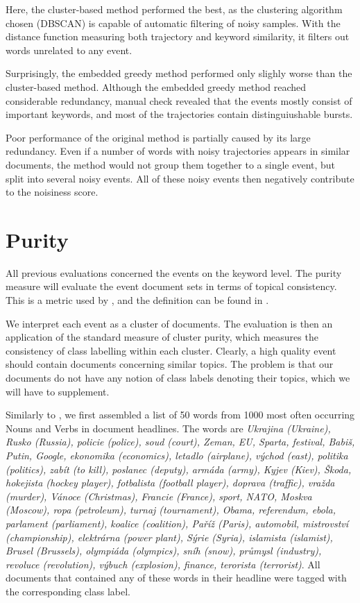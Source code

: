 Here, the cluster-based method performed the best, as the clustering algorithm chosen (DBSCAN) is capable of automatic filtering of noisy samples. With the distance function measuring both trajectory and keyword similarity, it filters out words unrelated to any event.

Surprisingly, the embedded greedy method performed only slighly worse than the cluster-based method. Although the embedded greedy method reached considerable redundancy, manual check revealed that the events mostly consist of important keywords, and most of the trajectories contain distinguiushable bursts.

Poor performance of the original method is partially caused by its large redundancy. Even if a number of words with noisy trajectories appears in similar documents, the method would not group them together to a single event, but split into several noisy events. All of these noisy events then negatively contribute to the noisiness score.

\section{Purity} \label{sec:purity}

All previous evaluations concerned the events on the keyword level. The purity measure will evaluate the event document sets in terms of topical consistency. This is a metric used by \cite{document-purity}, and the definition can be found in \cite{information-retrieval}.

We interpret each event as a cluster of documents. The evaluation is then an application of the standard measure of cluster purity, which measures the consistency of class labelling within each cluster. Clearly, a high quality event should contain documents concerning similar topics. The problem is that our documents do not have any notion of class labels denoting their topics, which we will have to supplement.

Similarly to \cite{document-purity}, we first assembled a list of 50 words from 1000 most often occurring Nouns and Verbs in document headlines. The words are \textit{Ukrajina (Ukraine), Rusko (Russia), policie (police), soud (court), Zeman, EU, Sparta, festival, Babiš, Putin, Google, ekonomika (economics), letadlo (airplane), východ (east), politika (politics), zabít (to kill), poslanec (deputy), armáda (army), Kyjev (Kiev), Škoda, hokejista (hockey player), fotbalista (football player), doprava (traffic), vražda (murder), Vánoce (Christmas), Francie (France), sport, NATO, Moskva (Moscow), ropa (petroleum), turnaj (tournament), Obama, referendum, ebola, parlament (parliament), koalice (coalition), Paříž (Paris), automobil, mistrovství (championship), elektrárna (power plant), Sýrie (Syria), islamista (islamist), Brusel (Brussels), olympiáda (olympics), sníh (snow), průmysl (industry), revoluce (revolution), výbuch (explosion), finance, terorista (terrorist)}. All documents that contained any of these words in their headline were tagged with the corresponding class label.

